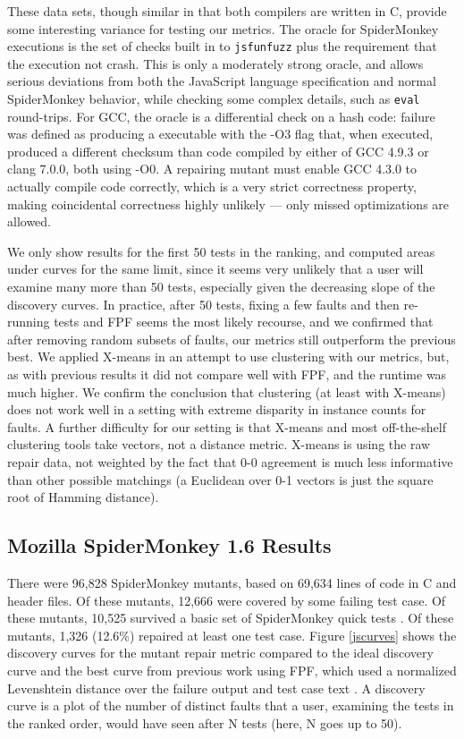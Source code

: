 These data sets, though similar in that both compilers are written in C, provide some interesting variance for testing our metrics.  The oracle for SpiderMonkey executions is the set of checks built in to {\tt jsfunfuzz} plus the requirement that the execution not crash.  This is only a moderately strong oracle, and allows serious deviations from both the JavaScript language specification and normal SpiderMonkey behavior, while checking some complex details, such as {\tt eval} round-trips.  For GCC, the oracle is a differential check on a hash code:  failure was defined as producing a executable with the -O3 flag that, when executed, produced a different checksum than code compiled by either of GCC 4.9.3 or clang 7.0.0, both using -O0.  A repairing mutant must enable GCC 4.3.0 to actually compile code correctly, which is a very strict correctness property, making coincidental correctness \cite{CCT} highly unlikely --- only missed optimizations are allowed.

We only show results for the first 50 tests in the ranking, and computed areas under curves for the same limit, since it seems very unlikely that a user will examine many more than 50 tests, especially given the decreasing slope of the discovery curves.  In practice, after 50 tests, fixing a few faults and then re-running tests and FPF seems the most likely recourse, and we confirmed that after removing random subsets of faults, our metrics still outperform the previous best.  We applied X-means \cite{xmeans} in an attempt to use clustering with our metrics, but, as with previous results \cite{PLDI13} it did not compare well with FPF, and the runtime was much higher.  We confirm the conclusion \cite{PLDI13} that clustering (at least with X-means) does not work well in a setting with extreme disparity in instance counts for faults.  A further difficulty for our setting is that X-means and most off-the-shelf clustering tools take vectors, not a distance metric.  X-means is using the raw repair data, not weighted by the fact that 0-0 agreement is much less informative than other possible matchings (a Euclidean over 0-1 vectors is just the square root of Hamming distance).

\subsection{Mozilla SpiderMonkey 1.6 Results}


There were 96,828 SpiderMonkey mutants, based on 69,634 lines of code in C and header files.  Of these mutants, 12,666 were covered by some failing test case.  Of these mutants, 10,525 survived a basic set of SpiderMonkey quick tests \cite{icst2014}.  Of these mutants, 1,326 (12.6\%) repaired at least one test case.  Figure \ref{jscurves} shows the discovery curves for the mutant repair metric compared to the ideal discovery curve and the best curve from previous work using FPF, which used a normalized Levenshtein distance \cite{lev} over the failure output and test case text \cite{PLDI13}.  A discovery curve is a plot of the number of distinct faults that a user, examining the tests in the ranked order, would have seen after N tests (here, N goes up to 50).

